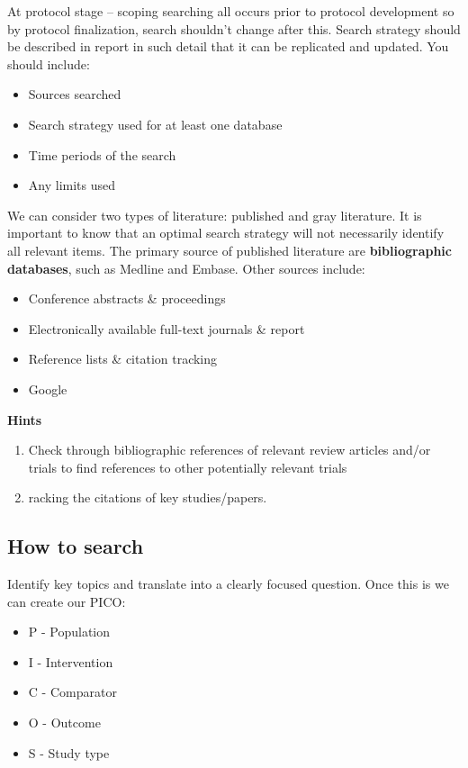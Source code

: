 \documentclass[
]{book}
\providecommand{\tightlist}{%
  \setlength{\itemsep}{0pt}\setlength{\parskip}{0pt}}
\begin{document}
At protocol stage -- scoping searching all occurs prior to protocol development so by protocol finalization, search shouldn't change after this. Search strategy should be described in report in such detail that it can be replicated and updated. You should include:

\begin{itemize}
\tightlist
\item
  Sources searched
\item
  Search strategy used for at least one database
\item
  Time periods of the search
\item
  Any limits used
\end{itemize}

We can consider two types of literature: published and gray literature. It is important to know that an optimal search strategy will not necessarily identify all relevant items. The primary source of published literature are \textbf{bibliographic databases}, such as Medline and Embase. Other sources include:

\begin{itemize}
\tightlist
\item
  Conference abstracts \& proceedings
\item
  Electronically available full-text journals \& report
\item
  Reference lists \& citation tracking
\item
  Google
\end{itemize}

\textbf{Hints}

\begin{enumerate}
\def\labelenumi{\arabic{enumi}.}
\tightlist
\item
  Check through bibliographic references of relevant review articles and/or trials to find references to other potentially relevant trials
\item
  racking the citations of key studies/papers.
\end{enumerate}

\hypertarget{how-to-search}{%
\subsection{How to search}\label{how-to-search}}

Identify key topics and translate into a clearly focused question. Once this is we can create our PICO:

\begin{itemize}
\tightlist
\item
  P - Population
\item
  I - Intervention
\item
  C - Comparator
\item
  O - Outcome
\item
  S - Study type
\end{itemize}
\end{document}
